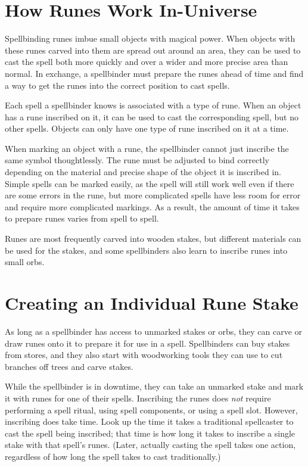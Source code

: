 \section{How Runes Work In-Universe}
Spellbinding runes imbue small objects with magical power. When objects with these runes carved into them are spread out around an area, they can be used to cast the spell both more quickly and over a wider and more precise area than normal. In exchange, a spellbinder must prepare the runes ahead of time and find a way to get the runes into the correct position to cast spells.

Each spell a spellbinder knows is associated with a type of rune. When an object has a rune inscribed on it, it can be used to cast the corresponding spell, but no other spells. Objects can only have one type of rune inscribed on it at a time.

When marking an object with a rune, the spellbinder cannot just inscribe the same symbol thoughtlessly. The rune must be adjusted to bind correctly depending on the material and precise shape of the object it is inscribed in. Simple spells can be marked easily, as the spell will still work well even if there are some errors in the rune, but more complicated spells have less room for error and require more complicated markings. As a result, the amount of time it takes to prepare runes varies from spell to spell.

Runes are most frequently carved into wooden stakes, but different materials can be used for the stakes, and some spellbinders also learn to inscribe runes into small orbs.

\section{Creating an Individual Rune Stake}
As long as a spellbinder has access to unmarked stakes or orbs, they can carve or draw runes onto it to prepare it for use in a spell. Spellbinders can buy stakes from stores, and they also start with woodworking tools they can use to cut branches off trees and carve stakes.

While the spellbinder is in downtime, they can take an unmarked stake and mark it with runes for one of their spells. Inscribing the runes does \textit{not} require performing a spell ritual, using spell components, or using a spell slot. However, inscribing does take time. Look up the time it takes a traditional spellcaster to cast the spell being inscribed; that time is how long it takes to inscribe a single stake with that spell's runes. (Later, actually casting the spell takes one action, regardless of how long the spell takes to cast traditionally.)

